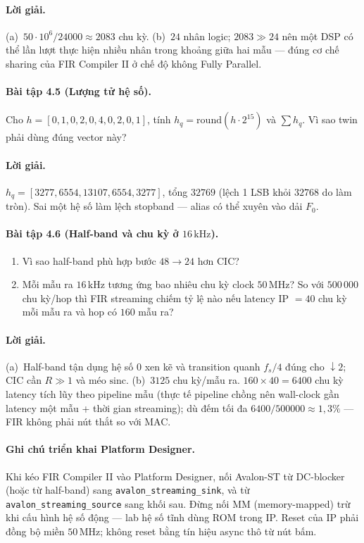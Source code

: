 \paragraph{Lời giải.} (a)~$50\cdot10^{6}/24000\approx 2083$ chu kỳ. (b)~$24$ nhân logic; $2083\gg 24$ nên một DSP có thể lần lượt thực hiện nhiều nhân trong khoảng giữa hai mẫu --- đúng cơ chế sharing của FIR Compiler II ở chế độ không Fully Parallel.

\paragraph{Bài tập 4.5 (Lượng tử hệ số).} Cho $h=[0{,}1,0{,}2,0{,}4,0{,}2,0{,}1]$, tính $h_q=\mathrm{round}(h\cdot 2^{15})$ và $\sum h_q$. Vì sao twin phải dùng đúng vector này?
\paragraph{Lời giải.} $h_q=[3277,6554,13107,6554,3277]$, tổng $32769$ (lệch 1 LSB khỏi $32768$ do làm tròn). Sai một hệ số làm lệch stopband --- alias có thể xuyên vào dải $F_0$.

\paragraph{Bài tập 4.6 (Half-band và chu kỳ ở $16\,\text{kHz}$).}
\begin{enumerate}[label=\alph*)]
  \item Vì sao half-band phù hợp bước $48\to 24$ hơn CIC?
  \item Mỗi mẫu ra $16\,\text{kHz}$ tương ứng bao nhiêu chu kỳ clock $50\,\text{MHz}$? So với $500\,000$ chu kỳ/hop thì FIR streaming chiếm tỷ lệ nào nếu latency IP $=40$ chu kỳ mỗi mẫu ra và hop có $160$ mẫu ra?
\end{enumerate}
\paragraph{Lời giải.} (a)~Half-band tận dụng hệ số 0 xen kẽ và transition quanh $f_s/4$ đúng cho $\downarrow 2$; CIC cần $R\gg 1$ và méo $\mathrm{sinc}$. (b)~$3125$ chu kỳ/mẫu ra. $160\times 40=6400$ chu kỳ latency tích lũy theo pipeline mẫu (thực tế pipeline chồng nên wall-clock gần latency một mẫu + thời gian streaming); dù đếm tối đa $6400/500000\approx 1{,}3\%$ --- FIR không phải nút thắt so với MAC.

\paragraph{Ghi chú triển khai Platform Designer.} Khi kéo FIR Compiler II vào Platform Designer, nối Avalon-ST từ DC-blocker (hoặc từ half-band) sang \texttt{avalon\_streaming\_sink}, và từ \texttt{avalon\_streaming\_source} sang khối sau. Đừng nối MM (memory-mapped) trừ khi cấu hình hệ số động --- lab hệ số tĩnh dùng ROM trong IP. Reset của IP phải đồng bộ miền $50\,\text{MHz}$; không reset bằng tín hiệu async thô từ nút bấm.

